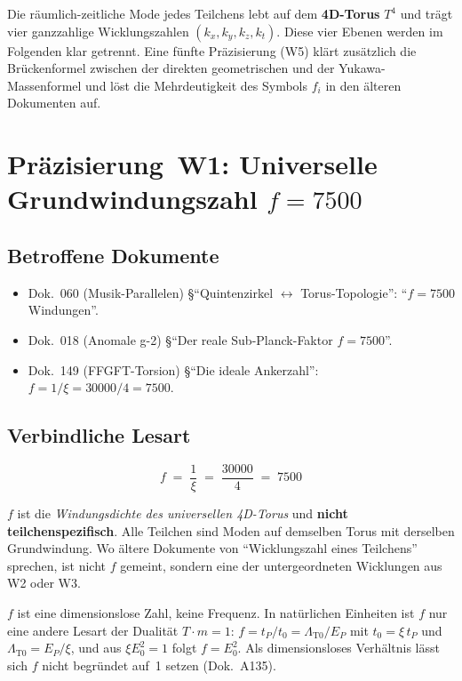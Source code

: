 Die räumlich-zeitliche Mode jedes Teilchens lebt auf dem
\textbf{4D-Torus} $T^4$ und trägt vier ganzzahlige Wicklungszahlen
$(k_x, k_y, k_z, k_t)$. Diese vier Ebenen werden im Folgenden klar
getrennt. Eine fünfte Präzisierung (W5) klärt zusätzlich die
Brückenformel zwischen der direkten geometrischen und der
Yukawa-Massenformel und löst die Mehrdeutigkeit des Symbols $f_i$
in den älteren Dokumenten auf.

\section{\texorpdfstring{Präzisierung~W1: Universelle Grundwindungszahl $f = 7500$}{Praezisierung W1: Universelle Grundwindungszahl f = 7500}}

\subsection*{Betroffene Dokumente}

\begin{itemize}
  \item Dok.~060 (Musik-Parallelen) §\enquote{Quintenzirkel
        $\leftrightarrow$ Torus-Topologie}: \enquote{$f = 7500$ Windungen}.
  \item Dok.~018 (Anomale g-2) §\enquote{Der reale Sub-Planck-Faktor
        $f = 7500$}.
  \item Dok.~149 (FFGFT-Torsion) §\enquote{Die ideale Ankerzahl}:
        $f = 1/\xi = 30000/4 = 7500$.
\end{itemize}

\subsection*{Verbindliche Lesart}

\begin{equation}
  \boxed{\;f \;=\; \frac{1}{\xi} \;=\; \frac{30000}{4} \;=\; 7500\;}
  \tag{210.1}
\end{equation}

$f$ ist die \emph{Windungsdichte des universellen 4D-Torus} und
\textbf{nicht teilchenspezifisch}. Alle Teilchen sind Moden auf
demselben Torus mit derselben Grundwindung. Wo ältere Dokumente von
\enquote{Wicklungszahl eines Teilchens} sprechen, ist nicht $f$
gemeint, sondern eine der untergeordneten Wicklungen aus
W2 oder W3.

$f$ ist eine dimensionslose Zahl, keine Frequenz. In natürlichen
Einheiten ist $f$ nur eine andere Lesart der Dualität $T\cdot m = 1$:
$f = t_P/t_0 = \Lambda_{\text{T0}}/E_P$ mit $t_0 = \xi\,t_P$ und
$\Lambda_{\text{T0}} = E_P/\xi$, und aus $\xi E_0^2 = 1$ folgt
$f = E_0^2$. Als dimensionsloses Verhältnis lässt sich $f$ nicht
begründet auf~1 setzen (Dok.~A135).

